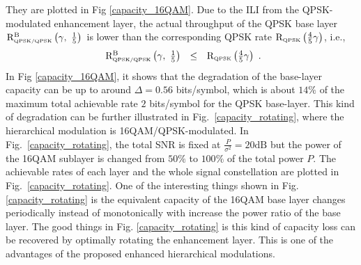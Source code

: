\documentclass[conference]{IEEEtran}
\begin{document}
\noindent They are plotted in Fig \ref{capacity_16QAM}. Due to the
ILI from the QPSK-modulated enhancement layer, the actual
throughput of the QPSK base layer ${\rm R}_{\mbox{\tiny
QPSK/QPSK}}^{\rm B}\left(\gamma,\ \frac{1}{5} \right)$ is lower
than the corresponding QPSK rate ${\rm R}_{\mbox{\tiny
QPSK}}\left(\frac{4}{5}\gamma\right)$, i.e.,
\begin{equation}
\begin{array}{rcl}
{\rm R}_{\mbox{\tiny QPSK/QPSK}}^{\rm B}\left(\gamma,\ \frac{1}{5}
\right)&\leq&{\rm R}_{\mbox{\tiny QPSK}}
\left(\frac{4}{5}\gamma\right)
\end{array}.\label{R_16QAM_B2}
\end{equation}
\noindent In Fig \ref{capacity_16QAM}, it shows that the
degradation of the base-layer capacity can be up to around
$\Delta=0.56$ bits/symbol, which is about $14\%$ of the maximum
total achievable rate $2$ bits/symbol for the QPSK base-layer.
This kind of degradation can be further illustrated in
Fig.~\ref{capacity_rotating}, where the hierarchical modulation is
16QAM/QPSK-modulated. In Fig.~\ref{capacity_rotating}, the total
SNR is fixed at $\frac{P}{\sigma^2}=20\mbox{dB}$ but the power of
the 16QAM sublayer is changed from $50\%$ to $100\%$ of the total
power $P$. The achievable rates of each layer and the whole signal
constellation are plotted in Fig.~\ref{capacity_rotating}. One of
the interesting things shown in Fig. \ref{capacity_rotating} is
the equivalent capacity of the 16QAM base layer changes
periodically instead of monotonically with increase the power
ratio of the base layer. The good things in Fig.
\ref{capacity_rotating} is this kind of capacity loss can be
recovered by optimally rotating the enhancement layer. This is one
of the advantages of the proposed enhanced hierarchical
modulations.

\begin{figure}
\end{figure}
\end{document}
